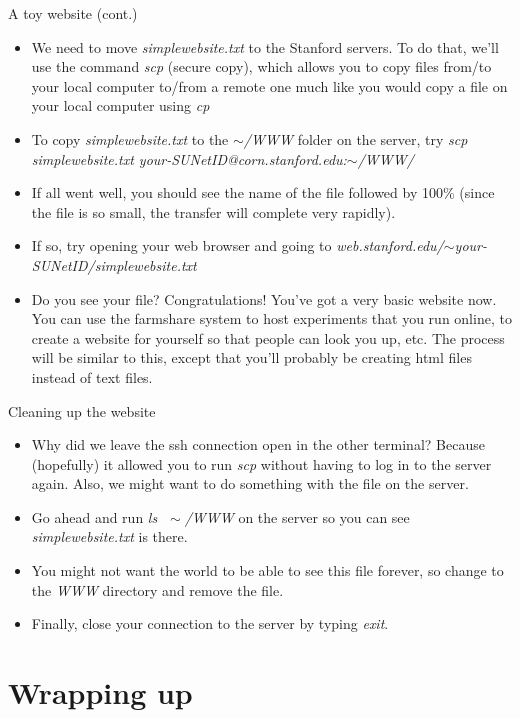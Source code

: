 \documentclass{beamer}
\begin{document}
\begin{frame}{A toy website (cont.)}
\begin{itemize}
    \item<1-> We need to move \emph{simplewebsite.txt} to the Stanford servers. To do that, we'll use the command \emph{scp} (secure copy), which allows you to copy files from/to your local computer to/from a remote one much like you would copy a file on your local computer using \emph{cp} 
    \item<2-> To copy \emph{simplewebsite.txt} to the \emph{$\sim$/WWW} folder on the server, try \emph{scp simplewebsite.txt your-SUNetID@corn.stanford.edu:$\sim$/WWW/} 
    \item<3-> If all went well, you should see the name of the file followed by 100\% (since the file is so small, the transfer will complete very rapidly). 
    \item<3-> If so, try opening your web browser and going to \emph{web.stanford.edu/$\sim$your-SUNetID/simplewebsite.txt} 
    \item<4-> Do you see your file? Congratulations! You've got a very basic website now. You can use the farmshare system to host experiments that you run online, to create a website for yourself so that people can look you up, etc. The process will be similar to this, except that you'll probably be creating html files instead of text files. 
\end{itemize}
\end{frame}

\begin{frame}{Cleaning up the website}
\begin{itemize}
    \item<1-> Why did we leave the ssh connection open in the other terminal? Because (hopefully) it allowed you to run \emph{scp} without having to log in to the server again. Also, we might want to do something with the file on the server.
    \item<2-> Go ahead and run \emph{ls $\;\sim$/WWW} on the server so you can see \emph{simplewebsite.txt} is there.
    \item<3-> You might not want the world to be able to see this file forever, so change to the \emph{WWW} directory and remove the file.
    \item<4-> Finally, close your connection to the server by typing \emph{exit}.
\end{itemize}
\end{frame}

\section{Wrapping up}
\end{document}
